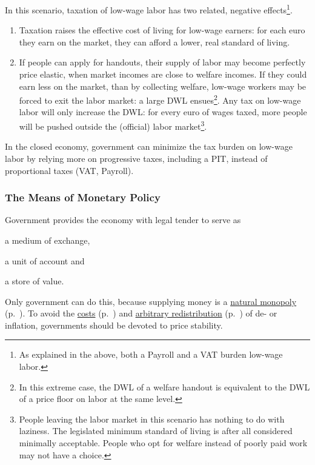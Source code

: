 In this scenario, taxation of low-wage labor has two related, negative effects\footnote{
	As explained in the above, both a \gls{Payroll} and a \gls{VAT} burden low-wage labor.}. 
\begin{enumerate}
	\item Taxation raises the effective cost of living for low-wage earners: for each euro they earn on the market, they can afford a lower, real standard of living. 
	\item If people can apply for handouts, their supply of labor may become perfectly price elastic, when market incomes are close to welfare incomes. If they could earn less on the market, than by collecting welfare, low-wage workers may be forced to exit the labor market: a large \gls{DWL} ensues\footnote{
		In this extreme case, the \gls{DWL} of a welfare handout is equivalent to the \gls{DWL} of a price floor on labor at the same level.}. 
	Any tax on low-wage labor will only increase the \gls{DWL}: for every euro of wages taxed, more people will be pushed outside the (official) labor market\footnote{
		People leaving the labor market in this scenario has nothing to do with laziness. The legislated minimum standard of living is after all considered minimally acceptable. People who opt for welfare instead of poorly paid work may not have a choice.}. 
\end{enumerate}

In the closed economy, government can minimize the tax burden on low-wage labor by relying more on progressive taxes, including a \gls{PIT}, instead of proportional taxes (\gls{VAT}, \gls{Payroll}).


\subsubsection[Monetary Policy]{The Means of Monetary Policy} \label{sec:monetary}
Government provides the economy with legal tender to serve as \begin{inparaenum}[1)] 
	\item a medium of exchange, 
	\item a unit of account and 
	\item a store of value. 
\end{inparaenum} 
Only government can do this, because supplying money is a \hyperref[sec:natural-monopoly]{natural monopoly} (p.~\pageref{sec:natural-monopoly}). To avoid the \hyperref[sec:price-stability]{costs} (p.~\pageref{sec:price-stability}) and  \hyperref[sec:distributive-effects-of-inflation]{arbitrary redistribution} (p.~\pageref{sec:distributive-effects-of-inflation}) of de- or inflation, 
governments should be devoted to price stability. 

